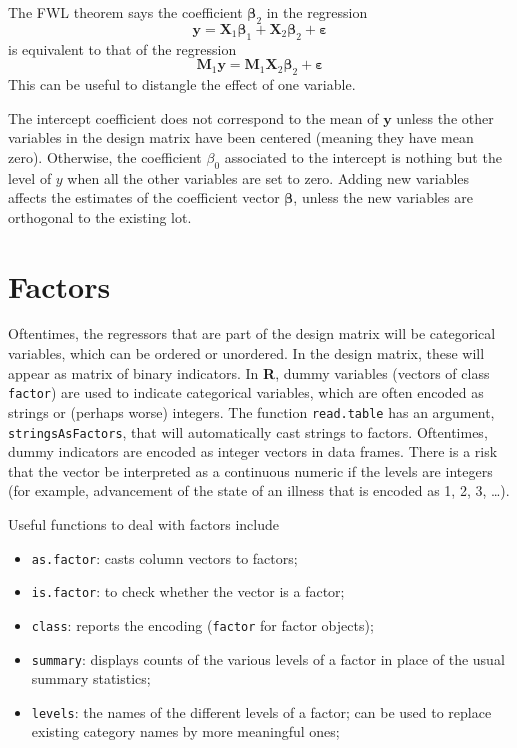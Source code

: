 \documentclass[]{book}
\providecommand{\tightlist}{%
  \setlength{\itemsep}{0pt}\setlength{\parskip}{0pt}}
\theoremstyle{definition}
\theoremstyle{definition}
\theoremstyle{definition}
\theoremstyle{remark}
\begin{document}
The FWL theorem says the coefficient \(\boldsymbol{\beta}_2\) in the regression
\[\boldsymbol{y} =\mathbf{X}_1\boldsymbol{\beta}_1 + \mathbf{X}_2\boldsymbol{\beta}_2 + \boldsymbol{\varepsilon}\] is equivalent to that of the regression
\[\mathbf{M}_1\boldsymbol{y} =\mathbf{M}_1 \mathbf{X}_2\boldsymbol{\beta}_2 + \boldsymbol{\varepsilon} \]
This can be useful to distangle the effect of one variable.

The intercept coefficient does not correspond to the mean of \(\boldsymbol{y}\) unless the other variables in the design matrix have been centered (meaning they have mean zero). Otherwise, the coefficient \(\beta_0\) associated to the intercept is nothing but the level of \(y\) when all the other variables are set to zero.
Adding new variables affects the estimates of the coefficient vector \(\boldsymbol{\beta}\), unless the new variables are orthogonal to the existing lot.

\hypertarget{factors}{%
\section{Factors}\label{factors}}

Oftentimes, the regressors that are part of the design matrix will be categorical variables, which can be ordered or unordered. In the design matrix, these will appear as matrix of binary indicators. In \textbf{R}, dummy variables (vectors of class \texttt{factor}) are used to indicate categorical variables, which are often encoded as strings or (perhaps worse) integers. The function \texttt{read.table} has an argument, \texttt{stringsAsFactors}, that will automatically cast strings to factors. Oftentimes, dummy indicators are encoded as integer vectors in data frames. There is a risk that the vector be interpreted as a continuous numeric if the levels are integers (for example, advancement of the state of an illness that is encoded as 1, 2, 3, \ldots).

Useful functions to deal with factors include

\begin{itemize}
\tightlist
\item
  \texttt{as.factor}: casts column vectors to factors;\\
\item
  \texttt{is.factor}: to check whether the vector is a factor;
\item
  \texttt{class}: reports the encoding (\texttt{factor} for factor objects);
\item
  \texttt{summary}: displays counts of the various levels of a factor in place of the usual summary statistics;
\item
  \texttt{levels}: the names of the different levels of a factor; can be used to replace existing category names by more meaningful ones;
\end{itemize}
\end{document}
